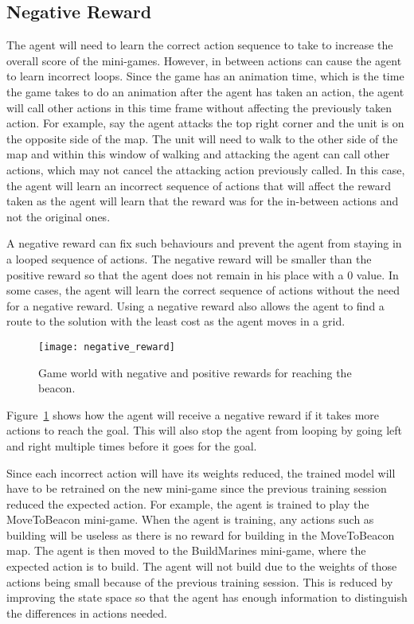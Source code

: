 \subsection{Negative Reward}

The agent will need to learn the correct action sequence to take to increase the
overall score of the mini-games. However, in between actions can cause the agent
to learn incorrect loops. Since the game has an animation time, which is the
time the game takes to do an animation after the agent has taken an action, the
agent will call other actions in this time frame without affecting the
previously taken action. For example, say the agent attacks the top right corner
and the unit is on the opposite side of the map. The unit will need to walk to
the other side of the map and within this window of walking and attacking the
agent can call other actions, which may not cancel the attacking action
previously called. In this case, the agent will learn an incorrect sequence of
actions that will affect the reward taken as the agent will learn that the
reward was for the in-between actions and not the original ones.

A negative reward can fix such behaviours and prevent the agent from staying in a
looped sequence of actions. The negative reward will be smaller than the
positive reward so that the agent does not remain in his place with a 0 value.
In some cases, the agent will learn the correct sequence of actions without the
need for a negative reward. Using a negative reward also allows the agent to
find a route to the solution with the least cost as the agent moves in a grid.

\begin{figure}[h]
    \centering
    \texttt{[image: negative\_reward]}
    \caption{Game world with negative and positive rewards for reaching the beacon.}%
    \label{fig:negative_reward}
\end{figure}

Figure~\ref{fig:negative_reward} shows how the agent will receive a negative
reward if it takes more actions to reach the goal. This will also stop the agent
from looping by going left and right multiple times before it goes for the goal. 

Since each incorrect action will have its weights reduced, the trained model will have to be retrained on the new mini-game since the previous training session reduced the expected action. For example, the agent is trained to play the MoveToBeacon mini-game. When the agent is training, any actions such as building will be useless as there is no reward for building in the MoveToBeacon map. The agent is then moved to the BuildMarines mini-game, where the expected action is to build. The agent will not build due to the weights of those actions being small because of the previous training session. This is reduced by improving the state space so that the agent has enough information to distinguish the differences in actions needed.

